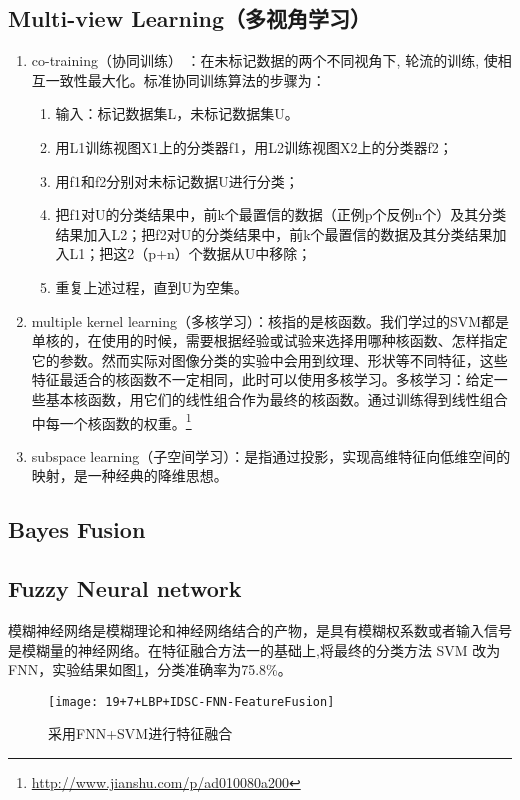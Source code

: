 \subsection{Multi-view Learning（多视角学习）}
\begin{enumerate}
\item co-training（协同训练） ：在未标记数据的两个不同视角下, 轮流的训练, 使相互一致性最大化。标准协同训练算法的步骤为：
    \begin{enumerate}
    \item 输入：标记数据集L，未标记数据集U。
    \item 用L1训练视图X1上的分类器f1，用L2训练视图X2上的分类器f2；
    \item 用f1和f2分别对未标记数据U进行分类；
    \item 把f1对U的分类结果中，前k个最置信的数据（正例p个反例n个）及其分类结果加入L2；把f2对U的分类结果中，前k个最置信的数据及其分类结果加入L1；把这2（p+n）个数据从U中移除；
    \item 重复上述过程，直到U为空集。
    \end{enumerate}
\item multiple kernel learning（多核学习）：核指的是核函数。我们学过的SVM都是单核的，在使用的时候，需要根据经验或试验来选择用哪种核函数、怎样指定它的参数。然而实际对图像分类的实验中会用到纹理、形状等不同特征，这些特征最适合的核函数不一定相同，此时可以使用多核学习。多核学习：给定一些基本核函数，用它们的线性组合作为最终的核函数。通过训练得到线性组合中每一个核函数的权重。\footnote{\url{http://www.jianshu.com/p/ad010080a200}}
\item subspace learning（子空间学习）：是指通过投影，实现高维特征向低维空间的映射，是一种经典的降维思想。
\end{enumerate}

\subsection{Bayes Fusion}

\subsection{Fuzzy Neural network}
模糊神经网络是模糊理论和神经网络结合的产物，是具有模糊权系数或者输入信号是模糊量的神经网络。在特征融合方法一的基础上,将最终的分类方法 SVM 改为FNN，实验结果如图\ref{fig:19+7+LBP+IDSC-FNN-FeatureFusion}，分类准确率为75.8\%。
\begin{figure}[!ht]
\centering
\texttt{[image: 19+7+LBP+IDSC-FNN-FeatureFusion]}
\caption{采用FNN+SVM进行特征融合}
\label{fig:19+7+LBP+IDSC-FNN-FeatureFusion}
\end{figure}


